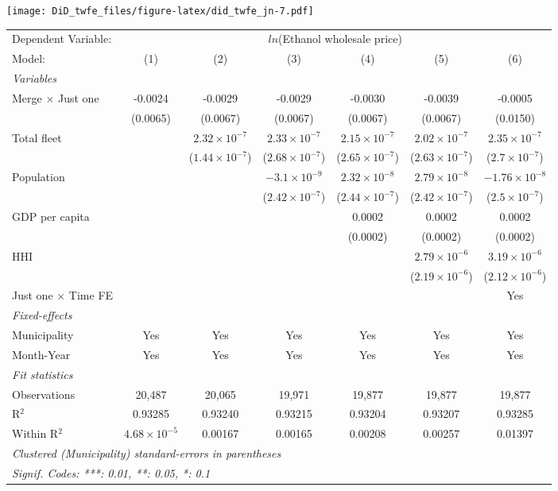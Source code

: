 \documentclass[
]{article}
\begin{document}
\texttt{[image: DiD\_twfe\_files/figure-latex/did\_twfe\_jn-7.pdf]}

\begin{tabular}{lcccccc}
\tabularnewline\midrule\midrule
Dependent Variable:&\multicolumn{6}{c}{$ln$(Ethanol wholesale price)}\\
Model:&(1) & (2) & (3) & (4) & (5) & (6)\\
\midrule \emph{Variables}&   &   &   &   &   &  \\
Merge $\times $ Just one & -0.0024 & -0.0029 & -0.0029 & -0.0030 & -0.0039 & -0.0005\\
  &(0.0065) & (0.0067) & (0.0067) & (0.0067) & (0.0067) & (0.0150)\\
Total fleet &    & $2.32\times 10^{-7}$ & $2.33\times 10^{-7}$ & $2.15\times 10^{-7}$ & $2.02\times 10^{-7}$ & $2.35\times 10^{-7}$\\
  &   & ($1.44\times 10^{-7}$) & ($2.68\times 10^{-7}$) & ($2.65\times 10^{-7}$) & ($2.63\times 10^{-7}$) & ($2.7\times 10^{-7}$)\\
Population &    &    & $-3.1\times 10^{-9}$ & $2.32\times 10^{-8}$ & $2.79\times 10^{-8}$ & $-1.76\times 10^{-8}$\\
  &   &    & ($2.42\times 10^{-7}$) & ($2.44\times 10^{-7}$) & ($2.42\times 10^{-7}$) & ($2.5\times 10^{-7}$)\\
GDP per capita &    &    &    & 0.0002 & 0.0002 & 0.0002\\
  &   &    &    & (0.0002) & (0.0002) & (0.0002)\\
HHI &    &    &    &    & $2.79\times 10^{-6}$ & $3.19\times 10^{-6}$\\
  &   &    &    &    & ($2.19\times 10^{-6}$) & ($2.12\times 10^{-6}$)\\
Just one $\times$ Time FE &  &  &  &  &  & Yes\\
\midrule \emph{Fixed-effects}&   &   &   &   &   &  \\
Municipality & Yes & Yes & Yes & Yes & Yes & Yes\\
Month-Year & Yes & Yes & Yes & Yes & Yes & Yes\\
\midrule \emph{Fit statistics}&  & & & & & \\
Observations & 20,487&20,065&19,971&19,877&19,877&19,877\\
R$^2$ & 0.93285&0.93240&0.93215&0.93204&0.93207&0.93285\\
Within R$^2$ & $4.68\times 10^{-5}$&0.00167&0.00165&0.00208&0.00257&0.01397\\
\midrule\midrule\multicolumn{7}{l}{\emph{Clustered (Municipality) standard-errors in parentheses}}\\
\multicolumn{7}{l}{\emph{Signif. Codes: ***: 0.01, **: 0.05, *: 0.1}}\\
\end{tabular}
\end{document}
